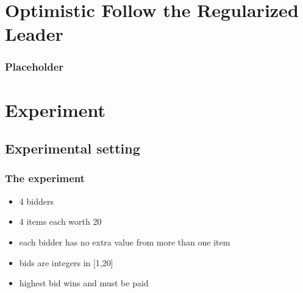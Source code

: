 \documentclass{beamer}
\begin{document}
\section[OFRL]{Optimistic Follow the Regularized Leader} %

\begin{frame}
	\frametitle{Placeholder}
\end{frame}


\section{Experiment}
\subsection{Experimental setting}
\begin{frame}
	\frametitle{The experiment}
	\begin{itemize}
		\item 4 bidders
		\item 4 items each worth 20
		\item each bidder has no extra value from more than one item
		\item bids are integers in [1,20]
		\item highest bid wins and must be paid
	\end{itemize}
\end{frame}
\end{document}
